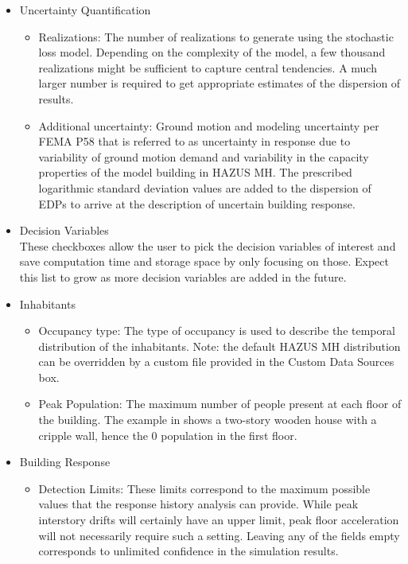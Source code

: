 \begin{itemize}
    \item Uncertainty Quantification
    \begin{itemize}
        \item Realizations: The number of realizations to generate using the stochastic loss model. Depending on the complexity of the model, a few thousand realizations might be sufficient to capture central tendencies. A much larger number is required to get appropriate estimates of the dispersion of results.
        \item Additional uncertainty: Ground motion and modeling uncertainty per FEMA P58 that is referred to as uncertainty in response due to variability of ground motion demand and variability in the capacity properties of the model building in HAZUS MH. The prescribed logarithmic standard deviation values are added to the dispersion of EDPs to arrive at the description of uncertain building response.
    \end{itemize}
    \item Decision Variables\\
    These checkboxes allow the user to pick the decision variables of interest and save computation time and storage space by only focusing on those. Expect this list to grow as more decision variables are added in the future.
    \item Inhabitants
    \begin{itemize}
        \item Occupancy type: The type of occupancy is used to describe the temporal distribution of the inhabitants. Note: the default HAZUS MH distribution can be overridden by a custom file provided in the Custom Data Sources box.
        \item Peak Population: The maximum number of people present at each floor of the building. The example in  shows a two-story wooden house with a cripple wall, hence the 0 population in the first floor.
    \end{itemize}
    \item Building Response
    \begin{itemize}
        \item Detection Limits: These limits correspond to the maximum possible values that the response history analysis can provide. While peak interstory drifts will certainly have an upper limit, peak floor acceleration will not necessarily require such a setting. Leaving any of the fields empty corresponds to unlimited confidence in the simulation results.\\

\end{itemize}
\end{itemize}
